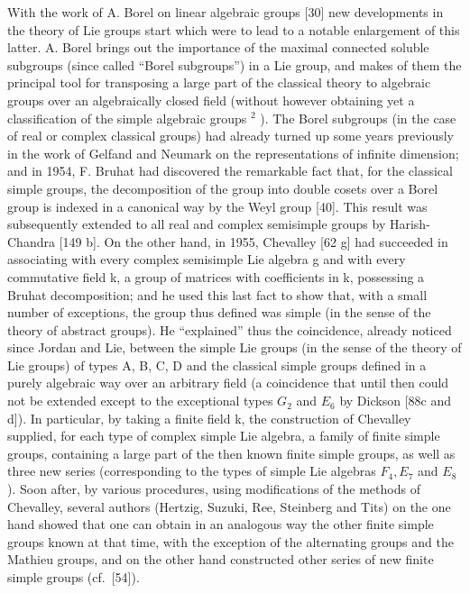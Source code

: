 With the work of A. Borel on linear algebraic groups {[}30{]} new developments in the theory of Lie groups start which were to lead to a notable enlargement of this latter. A. Borel brings out the importance of the maximal connected soluble subgroups (since called ``Borel subgroups'') in a Lie group, and makes of them the principal tool for transposing a large part of the classical theory to algebraic groups over an algebraically closed field (without however obtaining yet a classification of the simple algebraic groups \(^{2}\) ). The Borel subgroups (in the case of real or complex classical groups) had already turned up some years previously in the work of Gelfand and Neumark on the representations of infinite dimension; and in 1954, F. Bruhat had discovered the remarkable fact that, for the classical simple groups, the decomposition of the group into double cosets over a Borel group is indexed in a canonical way by the Weyl group {[}40{]}. This result was subsequently extended to all real and complex semisimple groups by Harish-Chandra {[}149 b{]}. On the other hand, in 1955, Chevalley {[}62 g{]} had succeeded in associating with every complex semisimple Lie algebra g and with every commutative field k, a group of matrices with coefficients in k, possessing a Bruhat decomposition; and he used this last fact to show that, with a small number of exceptions, the group thus defined was simple (in the sense of the theory of abstract groups). He ``explained'' thus the coincidence, already noticed since Jordan and Lie, between the simple Lie groups (in the sense of the theory of Lie groups) of types A, B, C, D and the classical simple groups defined in a purely algebraic way over an arbitrary field (a coincidence that until then could not be extended except to the exceptional types \(G_{2}\) and \(E_{6}\) by Dickson {[}88c and d{]}). In particular, by taking a finite field k, the construction of Chevalley supplied, for each type of complex simple Lie algebra, a family of finite simple groups, containing a large part of the then known finite simple groups, as well as three new series (corresponding to the types of simple Lie algebras \(F_{4}, E_{7}\) and \(E_{8}\) ). Soon after, by various procedures, using modifications of the methods of Chevalley, several authors (Hertzig, Suzuki, Ree, Steinberg and Tits) on the one hand showed that one can obtain in an analogous way the other finite simple groups known at that time, with the exception of the alternating groups and the Mathieu groups, and on the other hand constructed other series of new finite simple groups (cf.~{[}54{]}).

